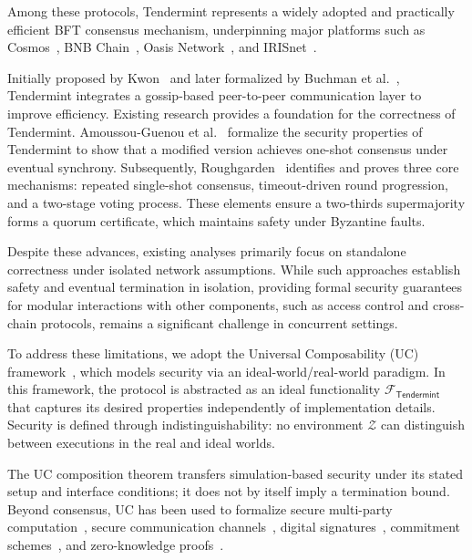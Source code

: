 \documentclass[conference,letterpaper,10pt]{IEEEtran}
\begin{document}
Among these protocols, Tendermint represents a widely adopted and practically efficient BFT consensus mechanism, underpinning major platforms such as Cosmos~\cite{kwon2019cosmos}, BNB Chain~\cite{bnbchain2020whitepaper}, Oasis Network~\cite{oasis2020whitepaper}, and IRISnet~\cite{irisnet2018whitepaper}.

Initially proposed by Kwon~\cite{kwon2014tendermint} and later formalized by Buchman et al.~\cite{buchman2018latest}, Tendermint integrates a gossip-based peer-to-peer communication layer to improve efficiency.
Existing research provides a foundation for the correctness of Tendermint. Amoussou-Guenou et al.~\cite{amoussou2018correctness} formalize the security properties of Tendermint to show that a modified version achieves one-shot consensus under eventual synchrony. Subsequently, Roughgarden~\cite{roughgarden2021lecture7} identifies and proves three core mechanisms: repeated single-shot consensus, timeout-driven round progression, and a two-stage voting process. These elements ensure a two-thirds supermajority forms a quorum certificate, which maintains safety under Byzantine faults.

Despite these advances, existing analyses primarily focus on standalone correctness under isolated network assumptions. While such approaches establish safety and eventual termination in isolation, providing formal security guarantees for modular interactions with other components, such as access control and cross-chain protocols, remains a significant challenge in concurrent settings.

To address these limitations, we adopt the Universal Composability (UC) framework~\cite{canetti2001universally}, which models security via an ideal-world/real-world paradigm. In this framework, the protocol is abstracted as an ideal functionality $\mathcal{F}_{ \scriptscriptstyle \mathsf{Tendermint}}$ that captures its desired properties independently of implementation details. Security is defined through indistinguishability: no environment $\mathcal{Z}$ can distinguish between executions in the real and ideal worlds.

The UC composition theorem transfers simulation-based security under its stated setup and interface conditions; it does not by itself imply a termination bound. Beyond consensus, UC has been used to formalize secure multi-party computation~\cite{canetti2002universally}, secure communication channels~\cite{canetti2002universallykeyexchange}, digital signatures~\cite{canetti2004universally}, commitment schemes~\cite{canetti2001universallycommitments}, and zero-knowledge proofs~\cite{camenisch2011framework}.
\end{document}
